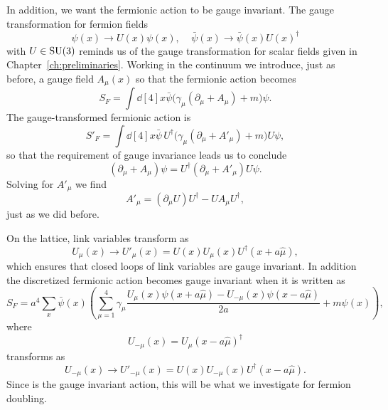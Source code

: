 In addition, we want the fermionic action to be gauge invariant. The
gauge transformation for fermion fields
\begin{equation}
  \psi(x)\to U(x)\psi(x),~~~~~\bar{\psi}(x)\to\bar{\psi}(x)U(x)^\dagger
\end{equation}
with $U\in\operatorname{SU}(3)$ reminds us of the gauge transformation for scalar 
fields given in Chapter~\ref{ch:preliminaries}. Working in the continuum 
we introduce, just as before, a gauge field $A_\mu(x)$ so that the 
fermionic action becomes
\begin{equation}
  S_F=\int\dd[4]{x}\bar{\psi}\big(\gamma_\mu(\partial_\mu+A_\mu)+m\big)\psi.
\end{equation}
The gauge-transformed fermionic action is
\begin{equation}
  S'_F=\int\dd[4]{x}\bar{\psi}\,U^\dagger
        \big(\gamma_\mu(\partial_\mu+A'_\mu)+m\big)U\psi,
\end{equation}
so that the requirement of gauge invariance leads us to conclude
\begin{equation}
  (\partial_\mu+A_\mu)\psi=U^\dagger(\partial_\mu+A'_\mu)U\psi.
\end{equation}
Solving for $A'_\mu$ we find
\begin{equation}
  A'_\mu=(\partial_\mu U)U^\dagger-UA_\mu U^\dagger,
\end{equation}
just as we did before.

On the lattice, link variables transform as
\begin{equation}
  U_\mu(x)\to U'_\mu(x)=U(x)U_\mu(x)U^\dagger(x+a\hat{\mu}),
\end{equation}
which ensures that closed loops of link variables are gauge invariant.
In addition the discretized fermionic action becomes gauge invariant
when it is written as
\begin{equation}\label{eq:naivefermactgauge}
  S_F=a^4\sum_x\bar{\psi}(x)\left(\sum_{\mu=1}^4\gamma_\mu
       \frac{U_\mu(x)\psi(x+a\hat{\mu})-U_{-\mu}(x)\psi(x-a\hat{\mu})}{2a}
       +m\psi(x)\right),
\end{equation}
where
\begin{equation}
  U_{-\mu}(x)=U_\mu(x-a\hat{\mu})^\dagger
\end{equation}
transforms as
\begin{equation}
  U_{-\mu}(x)\to U'_{-\mu}(x)=U(x)U_{-\mu}(x)U^\dagger(x-a\hat{\mu}).
\end{equation}
Since  is the gauge invariant action,
this will be what we investigate for fermion doubling.

